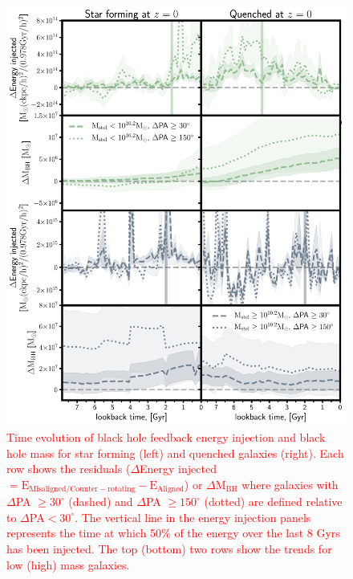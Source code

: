 \documentclass[fleqn,usenatbib]{mnras}
\newcommand{\red}[1]{{\textcolor{red}{#1}}}
\begin{document}
\begin{figure}
	\includegraphics[width=\linewidth]{overall_population/BH_props_only.pdf}
    \caption{\red{Time evolution of black hole feedback energy injection and black hole mass for star forming (left) and quenched galaxies (right). Each row shows the residuals ($\Delta$Energy injected$\mathrm{ = E_{Misaligned/Counter-rotating} - E_{Aligned}}$) or $\Delta \mathrm{M_{BH}}$ where galaxies with $\Delta$PA $\geq 30^{\circ}$ (dashed) and $\Delta$PA $\geq 150^{\circ}$ (dotted) are defined relative to $\Delta$PA$ < 30^{\circ}$. The vertical line in the energy injection panels represents the time at which 50\% of the energy over the last 8 Gyrs has been injected. The top (bottom) two rows show the trends for low (high) mass galaxies.}}
    \label{fig:BH_props}
\end{figure}

\end{document}

